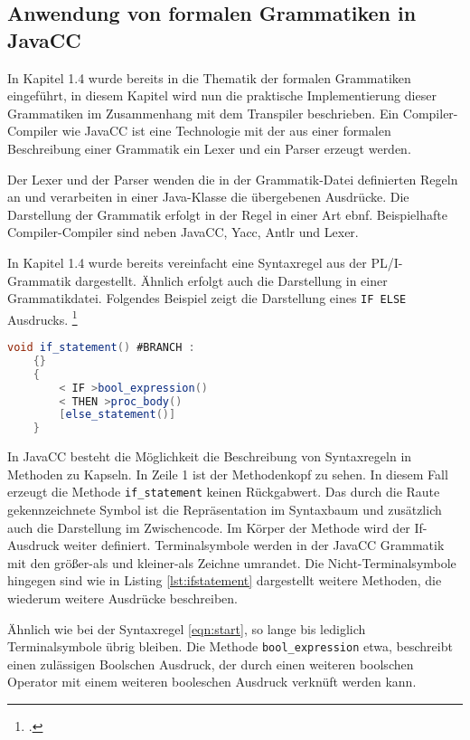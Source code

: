 \pagebreak
\subsection{Anwendung von formalen Grammatiken in JavaCC}

In Kapitel 1.4 wurde bereits in die Thematik der formalen Grammatiken eingeführt, in diesem Kapitel wird nun die praktische Implementierung dieser Grammatiken im Zusammenhang mit dem Transpiler beschrieben.
Ein Compiler-Compiler wie JavaCC ist eine Technologie mit der aus einer formalen Beschreibung einer Grammatik ein Lexer und ein Parser erzeugt werden. 

Der Lexer und der Parser wenden die in der Grammatik-Datei definierten Regeln an und verarbeiten in einer Java-Klasse die übergebenen Ausdrücke.
Die Darstellung der Grammatik erfolgt in der Regel in einer Art \ac{ebnf}. 
Beispielhafte Compiler-Compiler sind neben JavaCC, Yacc, Antlr und Lexer.


In Kapitel 1.4 wurde bereits vereinfacht eine Syntaxregel aus der PL/I-Grammatik dargestellt. Ähnlich erfolgt auch die Darstellung in einer Grammatikdatei. Folgendes Beispiel zeigt die Darstellung eines \verb+IF ELSE+ Ausdrucks. 
\footcite[Vgl. ][]{javaccdoku}


\begin{lstlisting}[language=Java, caption=If Statement aus der Grammatikdatei, label={lst:ifstatement}]
	void if_statement() #BRANCH :
	{}
	{
		< IF >bool_expression()
		< THEN >proc_body()
		[else_statement()]
	}
\end{lstlisting}

In JavaCC besteht die Möglichkeit die Beschreibung von Syntaxregeln in Methoden zu Kapseln.
In Zeile 1 ist der Methodenkopf zu sehen. In diesem Fall erzeugt die Methode \verb+if_statement+ keinen Rückgabwert.
Das durch die Raute gekennzeichnete Symbol ist die Repräsentation im Syntaxbaum und zusätzlich auch die Darstellung im Zwischencode.
Im Körper der Methode wird der If-Ausdruck weiter definiert. Terminalsymbole werden in der JavaCC Grammatik mit den größer-als und kleiner-als Zeichne umrandet. Die Nicht-Terminalsymbole hingegen sind wie in Listing \ref{lst:ifstatement} dargestellt weitere Methoden, die wiederum weitere Ausdrücke beschreiben.

Ähnlich wie bei der Syntaxregel \ref{eqn:start}, so lange bis lediglich Terminalsymbole übrig bleiben.
Die Methode \verb+bool_expression+ etwa, beschreibt einen zulässigen Boolschen Ausdruck, der durch einen weiteren boolschen Operator mit einem weiteren booleschen Ausdruck verknüft werden kann.

